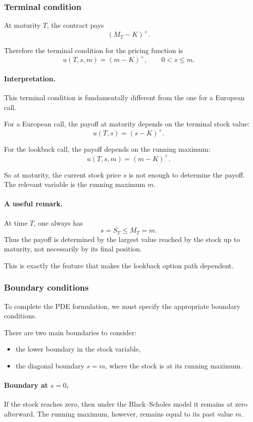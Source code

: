 \documentclass[11pt]{article}
\theoremstyle{plain}
\theoremstyle{definition}
\theoremstyle{remark}
\begin{document}
\subsubsection{Terminal condition}

At maturity \(T\), the contract pays
\[
(M_T-K)^+.
\]

Therefore the terminal condition for the pricing function is
\[
\boxed{
u(T,s,m)=(m-K)^+,
\qquad 0<s\le m.
}
\]

\paragraph{Interpretation.}
This terminal condition is fundamentally different from the one for a
European call.

For a European call, the payoff at maturity depends on the terminal
stock value:
\[
u(T,s)=(s-K)^+.
\]

For the lookback call, the payoff depends on the running maximum:
\[
u(T,s,m)=(m-K)^+.
\]

So at maturity, the current stock price \(s\) is not enough to determine
the payoff.
The relevant variable is the running maximum \(m\).

\paragraph{A useful remark.}
At time \(T\), one always has
\[
s=S_T\le M_T=m.
\]
Thus the payoff is determined by the largest value reached by the stock
up to maturity, not necessarily by its final position.

This is exactly the feature that makes the lookback option path
dependent.

\subsubsection{Boundary conditions}

To complete the PDE formulation, we must specify the appropriate
boundary conditions.

There are two main boundaries to consider:
\begin{itemize}[leftmargin=1.4em]
    \item the lower boundary in the stock variable,
    \item the diagonal boundary \(s=m\), where the stock is at its
    running maximum.
\end{itemize}

\paragraph{Boundary at \(s=0\).}
If the stock reaches zero, then under the Black--Scholes model it
remains at zero afterward.
The running maximum, however, remains equal to its past value \(m\).
\end{document}
